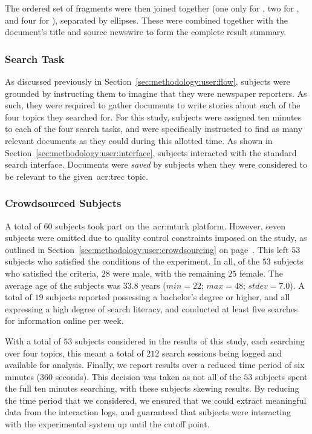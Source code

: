 The ordered set of fragments were then joined together (one only for , two for , and four for ), separated by ellipses. These were combined together with the document's title and source newswire to form the complete result summary.

\subsubsection{Search Task}
As discussed previously in Section~\ref{sec:methodology:user:flow}, subjects were grounded by instructing them to imagine that they were newspaper reporters. As such, they were required to gather documents to write stories about each of the four topics they searched for. For this study, subjects were assigned ten minutes to each of the four search tasks, and were specifically instructed to find as many relevant documents as they could during this allotted time. As shown in Section~\ref{sec:methodology:user:interface}, subjects interacted with the standard search interface. Documents were \emph{saved} by subjects when they were considered to be relevant to the given~\gls{acr:trec} topic.

\subsubsection{Crowdsourced Subjects}\label{sec:snippets:method:subjects}
A total of $60$ subjects took part on the~\gls{acr:mturk} platform. However, seven subjects were omitted due to quality control constraints imposed on the study, as outlined in Section~\ref{sec:methodology:user:crowdsourcing} on page~\pageref{sec:methodology:user:crowdsourcing}. This left $53$ subjects who satisfied the conditions of the experiment. In all, of the $53$ subjects who satisfied the criteria, $28$ were male, with the remaining $25$ female. The average age of the subjects was $33.8$ years ($min=22$; $max=48$; $stdev=7.0$). A total of $19$ subjects reported possessing a bachelor's degree or higher, and all expressing a high degree of search literacy, and conducted at least five searches for information online per week.

With a total of $53$ subjects considered in the results of this study, each searching over four topics, this meant a total of $212$ search sessions being logged and available for analysis. Finally, we report results over a reduced time period of six minutes ($360$ seconds). This decision was taken as not all of the $53$ subjects spent the full ten minutes searching, with these subjects skewing results. By reducing the time period that we considered, we ensured that we could extract meaningful data from the interaction logs, and guaranteed that subjects were interacting with the experimental system up until the cutoff point.

